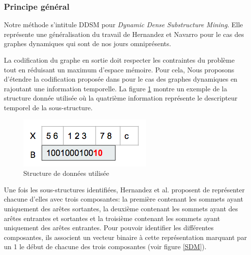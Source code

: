 		\subsubsection{Principe général}
			Notre méthode s'intitule DDSM pour \textit{Dynamic Dense Substructure Mining}. Elle représente une généralisation du travail de Hernandez et Navarro \citep{hernandez2014compressed} pour le cas des graphes dynamiques qui sont de nos jours omniprésents.
			
			
			La codification du graphe en sortie doit respecter les contraintes du problème tout en réduisant un maximum d'espace mémoire. Pour cela, Nous proposons d'étendre la codification proposée dans \citep{hernandez2014compressed} pour le cas des graphes dynamiques en rajoutant une information temporelle. La figure \ref{ddsm_exem} montre un exemple de la structure donnée utilisée où la quatrième information représente le descripteur temporel de la sous-structure.
			
			
			\begin{figure}[H]
\centering
	\includegraphics[scale=0.6]{./ressources/image/ddsm_exem.png}
	\caption[Structure de données utilisée]{Structure de données utilisée}
	\label{ddsm_exem}
	\end{figure}
			
			Une fois les sous-structures identifiées, Hernandez et al. \citep{hernandez2014compressed} proposent de représenter chacune d'elles avec trois composantes: la première contenant les sommets ayant uniquement des arêtes sortantes, la deuxième contenant les sommets ayant des arêtes entrantes et sortantes et la troisième contenant les sommets ayant uniquement des arêtes entrantes. Pour pouvoir identifier les différentes composantes, ils associent un vecteur binaire à cette représentation marquant par un 1 le début de chacune des trois composantes (voir figure \ref{SDM}).
			
